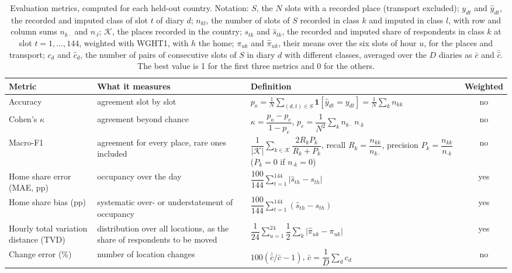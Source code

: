 \documentclass[a4paper]{article}
\begin{document}
\begin{table}[ht]
  \centering
  \footnotesize
  \caption{Evaluation metrics, computed for each held-out country. Notation: $S$, the $N$ slots with a recorded place (transport excluded); $y_{dt}$ and $\hat y_{dt}$, the recorded and imputed class of slot $t$ of diary $d$; $n_{kl}$, the number of slots of $S$ recorded in class $k$ and imputed in class $l$, with row and column sums $n_{k\cdot}$ and $n_{\cdot l}$; $\mathcal{K}$, the places recorded in the country; $s_{tk}$ and $\hat s_{tk}$, the recorded and imputed share of respondents in class $k$ at slot $t = 1, \dots, 144$, weighted with WGHT1, with $h$ the home; $\pi_{uk}$ and $\hat\pi_{uk}$, their means over the six slots of hour $u$, for the places and transport; $c_d$ and $\hat c_d$, the number of pairs of consecutive slots of $S$ in diary $d$ with different classes, averaged over the $D$ diaries as $\bar c$ and $\bar{\hat c}$. The best value is 1 for the first three metrics and 0 for the others.}
  \label{tab:metrics}
  \begin{tabularx}{\textwidth}{@{}>{\raggedright\arraybackslash}p{2.9cm}>{\raggedright\arraybackslash}p{3.2cm}Lc@{}}
    \toprule
    Metric & What it measures & Definition & Weighted \\
    \midrule
    Accuracy & agreement slot by slot & $p_o = \frac{1}{N} \sum_{(d,t) \in S} \mathbf{1}[\hat y_{dt} = y_{dt}] = \frac{1}{N} \sum_k n_{kk}$ & no \\[3pt]
    Cohen's $\kappa$ \parencite{cohenCoefficientAgreementNominal1960} & agreement beyond chance & $\kappa = \dfrac{p_o - p_e}{1 - p_e}$, \quad $p_e = \dfrac{1}{N^2} \sum_k n_{k\cdot}\, n_{\cdot k}$ & no \\[6pt]
    Macro-F1 & agreement for every place, rare ones included & $\dfrac{1}{|\mathcal{K}|} \sum_{k \in \mathcal{K}} \dfrac{2 R_k P_k}{R_k + P_k}$, \quad recall $R_k = \dfrac{n_{kk}}{n_{k\cdot}}$, precision $P_k = \dfrac{n_{kk}}{n_{\cdot k}}$ ($P_k = 0$ if $n_{\cdot k} = 0$) & no \\
    \addlinespace
    Home share error (MAE, pp) & occupancy over the day & $\dfrac{100}{144} \sum_{t=1}^{144} \lvert \hat s_{th} - s_{th} \rvert$ & yes \\[6pt]
    Home share bias (pp) & systematic over- or understatement of occupancy & $\dfrac{100}{144} \sum_{t=1}^{144} (\hat s_{th} - s_{th})$ & yes \\[6pt]
    Hourly total variation distance (TVD) & distribution over all locations, as the share of respondents to be moved & $\dfrac{1}{24} \sum_{u=1}^{24} \dfrac{1}{2} \sum_k \lvert \hat\pi_{uk} - \pi_{uk} \rvert$ & yes \\
    \addlinespace
    Change error (\%) & number of location changes & $100 \left( \bar{\hat c} / \bar c - 1 \right)$, \quad $\bar c = \dfrac{1}{D} \sum_d c_d$ & no \\
    \bottomrule
  \end{tabularx}
\end{table}
\end{document}
